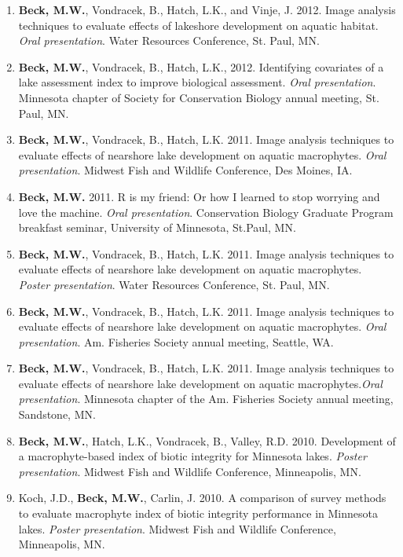 \documentclass[letterpaper,12pt]{article}
\begin{document}
\begin{enumerate}
\item {\bf Beck, M.W.}, Vondracek, B., Hatch, L.K., and Vinje, J. 2012. Image analysis techniques to evaluate effects of lakeshore development on aquatic habitat. \textit{Oral presentation}. Water Resources Conference, St. Paul, MN.

\item {\bf Beck, M.W.}, Vondracek, B., Hatch, L.K., 2012. Identifying covariates of a lake assessment index to improve biological assessment. \textit{Oral presentation}. Minnesota chapter of Society for Conservation Biology annual meeting, St. Paul, MN.

\item {\bf Beck, M.W.}, Vondracek, B., Hatch, L.K. 2011. Image analysis techniques to evaluate effects of nearshore lake development on aquatic macrophytes. \textit{Oral presentation}. Midwest Fish and Wildlife Conference, Des Moines, IA.

\item {\bf Beck, M.W.} 2011. R is my friend: Or how I learned to stop worrying and love the machine. \textit{Oral presentation}. Conservation Biology Graduate Program breakfast seminar, University of Minnesota, St.Paul, MN.

\item {\bf Beck, M.W.}, Vondracek, B., Hatch, L.K. 2011. Image analysis techniques to evaluate effects of nearshore lake development on aquatic macrophytes. \textit{Poster presentation}. Water Resources Conference, St. Paul, MN.

\item {\bf Beck, M.W.}, Vondracek, B., Hatch, L.K. 2011. Image analysis techniques to evaluate effects of nearshore lake development on aquatic macrophytes. \textit{Oral presentation}. Am. Fisheries Society annual meeting, Seattle, WA.

\item {\bf Beck, M.W.}, Vondracek, B., Hatch, L.K. 2011. Image analysis techniques to evaluate effects of nearshore lake development on aquatic macrophytes.\textit{Oral presentation}. Minnesota chapter of the Am. Fisheries Society annual meeting, Sandstone, MN.

\item {\bf Beck, M.W.}, Hatch, L.K., Vondracek, B., Valley, R.D. 2010. Development of a macrophyte-based index of biotic integrity for Minnesota lakes. \textit{Poster presentation}. Midwest Fish and Wildlife Conference, Minneapolis, MN.

\item Koch, J.D., {\bf Beck, M.W.}, Carlin, J. 2010. A comparison of survey methods to evaluate macrophyte index of biotic integrity performance in Minnesota lakes. \textit{Poster presentation}. Midwest Fish and Wildlife Conference, Minneapolis, MN.


\end{enumerate}
\end{document}
